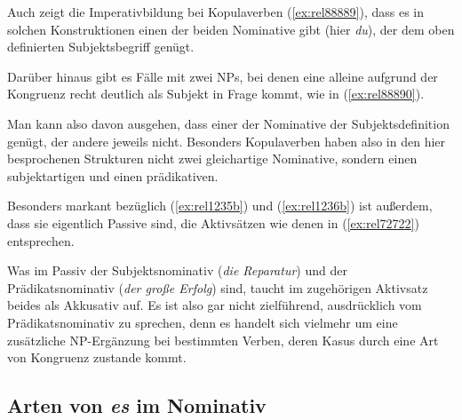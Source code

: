 Auch zeigt die Imperativbildung bei Kopulaverben (\ref{ex:rel88889}), dass es in solchen Konstruktionen einen der beiden Nominative gibt (hier \textit{du}), der dem oben definierten Subjektsbegriff genügt.

\begin{exe}
  \ex\label{ex:rel88889}
  \begin{xlist}
  \end{xlist}
\end{exe}

Darüber hinaus gibt es Fälle mit zwei NPs, bei denen eine alleine aufgrund der Kongruenz recht deutlich als Subjekt in Frage kommt, wie in (\ref{ex:rel88890}).

\begin{exe}
\end{exe}

Man kann also davon ausgehen, dass einer der Nominative der Subjektsdefinition genügt, der andere jeweils nicht.
Besonders Kopulaverben haben also in den hier besprochenen Strukturen nicht zwei gleichartige Nominative, sondern einen subjektartigen und einen prädikativen.

Besonders markant bezüglich (\ref{ex:rel1235b}) und (\ref{ex:rel1236b}) ist außerdem, dass sie eigentlich Passive sind, die Aktivsätzen wie denen in (\ref{ex:rel72722}) entsprechen.

\begin{exe}
  \ex\label{ex:rel72722}
  \begin{xlist}
  \end{xlist}
\end{exe}

Was im Passiv der Subjektsnominativ (\textit{die Reparatur}) und der Prädikatsnominativ (\textit{der große Erfolg}) sind, taucht im zugehörigen Aktivsatz beides als Akkusativ auf.
Es ist also gar nicht zielführend, ausdrücklich vom Prädikatsnominativ zu sprechen, denn es handelt sich vielmehr um eine zusätzliche NP-Ergänzung bei bestimmten Verben, deren Kasus durch eine Art von Kongruenz zustande kommt.

\subsection{Arten von \textit{es} im Nominativ}

